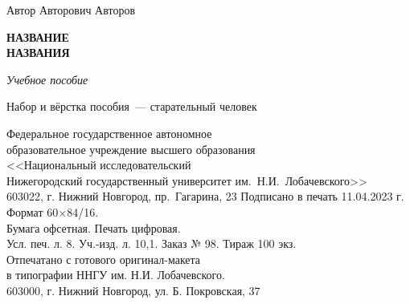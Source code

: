 \begin{titlepage}
\thispagestyle{empty}
\hphantom{A}
\vfill
\begin{center}
{
Автор Авторович Авторов\\

\vskip 20pt

{\large \bf НАЗВАНИЕ\\[.25em]НАЗВАНИЯ}

\vskip 20pt

\textit{\fontsize{12pt}{1em}\selectfont Учебное пособие}
}
\vskip 20pt
{\large
\fontsize{14pt}{1em}\selectfont
Набор и вёрстка пособия~---  старательный человек
}
\vskip 40pt

Федеральное государственное автономное\\
образовательное учреждение высшего образования\\
<<Национальный исследовательский\\
Нижегородский государственный университет им.~Н.И.~Лобачевского>>\\
603022, г. Нижний Новгород, пр.~Гагарина, 23
\vskip 20pt
Подписано в печать 11.04.2023 г. Формат 60$\times$84/16.\\
Бумага офсетная. Печать цифровая.\\
Усл. печ. л. 8. Уч.-изд. л. 10,1. Заказ № 98. Тираж 100 экз.\\
\vskip 20pt
Отпечатано с готового оригинал-макета\\
в типографии ННГУ им. Н.И. Лобачевского.\\
603000, г. Нижний Новгород, ул. Б. Покровская, 37
\vskip 50pt

\end{center}
\end{titlepage}

